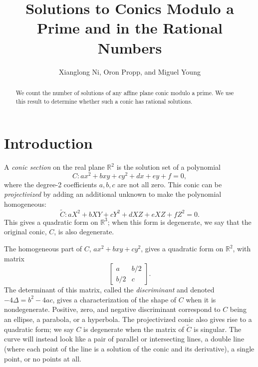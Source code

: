 \documentclass[10pt,a4paper]{amsart}
\numberwithin{equation}{section}
\numberwithin{figure}{section}
\numberwithin{table}{section}
\theoremstyle{definition}
\theoremstyle{plain}
\theoremstyle{remark}
\theoremstyle{plain}
\theoremstyle{definition}
\theoremstyle{plain}
\theoremstyle{plain}
\newcommand{\R}{\mathbb{R}}
\begin{document}
 
	
	\title{Solutions to Conics Modulo a Prime and in the Rational Numbers} 
	\author{Xianglong Ni, Oron Propp, and Miguel Young}
	\maketitle
	
	\begin{abstract} 
		We count the number of solutions of any affine plane conic modulo a prime.
		We use this result to determine whether such a conic has rational solutions. 
	\end{abstract}
	
	\tableofcontents
	
	\section{Introduction}\label{sec:intro} 
	
	A \emph{conic section} on the real plane $\R^2$ is the solution set of 
	a polynomial
	\[ C: ax^2 + bxy + cy^2 + dx + ey + f = 0, \]
	where the degree-2 coefficients $a, b, c$ are not all zero. This conic can be \emph{projectivized} by adding an additional
	unknown to make the polynomial homogeneous:
	\[ \widetilde{C}: aX^2 + bXY + cY^2 + dXZ + eXZ + fZ^2 = 0. \]
	This gives a quadratic form on $\R^3$; when this form is degenerate, we
	say that the original conic, $C$, is also degenerate.
	
	The homogeneous part of $C$, $ax^2 + bxy + cy^2$, gives a quadratic form
	on $\R^2$, with matrix
	\[ \begin{bmatrix}
	a & b/2 \\
	b/2 & c
	\end{bmatrix}. \]
	The determinant of this matrix, called the \emph{discriminant} and
	denoted $-4\Delta = b^2 - 4ac$, gives a characterization of the shape of $C$
	when it is nondegenerate. Positive, zero, and negative discriminant
	correspond to $C$ being an ellipse, a parabola, or a hyperbola. The
	projectivized conic also gives rise to a quadratic form; we say $C$ is
	degenerate when the matrix of $\widetilde{C}$ is singular. The curve
	will instead look like a pair of parallel or intersecting lines, a double
	line (where each point of the line is a solution of the conic and its 
	derivative), a single point, or no points at all. 
	
\end{document}
